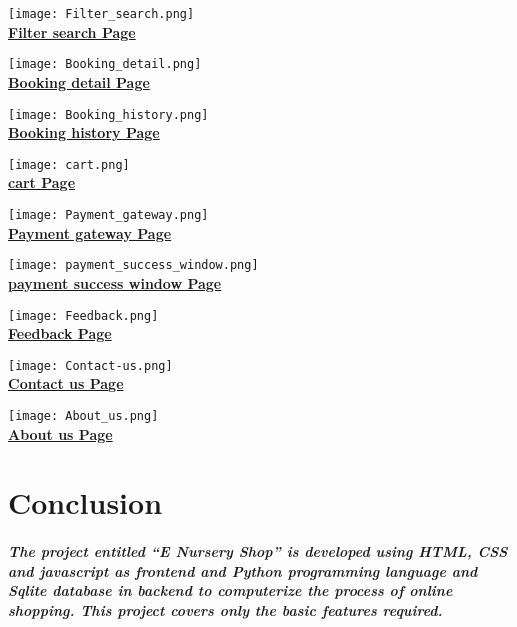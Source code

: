 \documentclass[12pt,a4paper]{report}
\begin{document}
		\begin{center}
			\texttt{[image: Filter\_search.png]}
			\\
			\textbf{\underline{Filter search Page}}
		\end{center}
		\begin{center}
			\texttt{[image: Booking\_detail.png]}
			\\
			\textbf{\underline{Booking detail Page}}
		\end{center}
		\begin{center}
			\texttt{[image: Booking\_history.png]}
			\\
			\textbf{\underline{Booking history Page}}
		\end{center}
		\begin{center}
			\texttt{[image: cart.png]}
			\\
			\textbf{\underline{cart Page}}
		\end{center}
		\begin{center}
			\texttt{[image: Payment\_gateway.png]}
			\\
			\textbf{\underline{Payment gateway Page}}
		\end{center}
		\begin{center}
			\texttt{[image: payment\_success\_window.png]}
			\\
			\textbf{\underline{payment success window Page}}
		\end{center}
		\begin{center}
			\texttt{[image: Feedback.png]}
			\\
			\textbf{\underline{Feedback Page}}
		\end{center}
		\begin{center}
			\texttt{[image: Contact-us.png]}
			\\
			\textbf{\underline{Contact us Page}}
		\end{center}
		\begin{center}
			\texttt{[image: About\_us.png]}
			\\
			\textbf{\underline{About us Page}}
		\end{center}
		\chapter{Conclusion}
		\paragraph
		{
			The project entitled “E Nursery Shop” is developed using HTML, CSS and javascript as frontend and Python programming language and Sqlite database in backend to computerize the process of online shopping. This project covers only the basic features required.
		}
\end{document}
